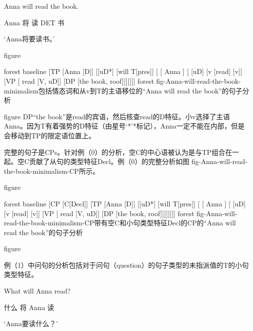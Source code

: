 Anna will read the book.

Anna 将 读 DET 书

`Anna将要读书。'

figure

forest
baseline
[TP
 [Anna [D]]
 [[uD*]
   [will T[pres]]
   [
     [ Anna ]
     [ [uD]
       [v
         [read] [v]]
       [VP
         [ read  [V, uD]]
         [DP [the book, roof]]]]]]]
forest
fig-Anna-will-read-the-book-minimalism包括情态词和从v到T的主语移位的“Anna will read the book”的句子分析


figure
DP“the book”是read的宾语，然后核查read的D特征。小v选择了主语Anna。因为T有着强势的D特征（由星号`*'*标记），Anna一定不能在内部，但是会移动到TP的限定语位置上。




完整的句子是CPs。针对例（0）的分析，空C的中心语被认为是与TP组合在一起。空C贡献了从句的类型特征Decl。例（0）的完整分析如图 fig-Anna-will-read-the-book-minimalism-CP所示。



figure

forest
baseline
[CP
 [C[Decl]]
 [TP
 [Anna [D]]
 [[uD*]
   [will T[pres]]
   [
     [ Anna ]
     [ [uD]
       [v
         [read] [v]]
       [VP
         [ read  [V, uD]]
         [DP [the book, roof]]]]]]]]
forest
fig-Anna-will-read-the-book-minimalism-CP带有空C和小句类型特征Decl的CP的“Anna will read the book”的句子分析


figure





































例（1）中问句的分析包括对于问句（question）的句子类型的未指派值的T的小句类型特征。



What will Anna read?

什么 将 Anna 读

`Anna要读什么？'

